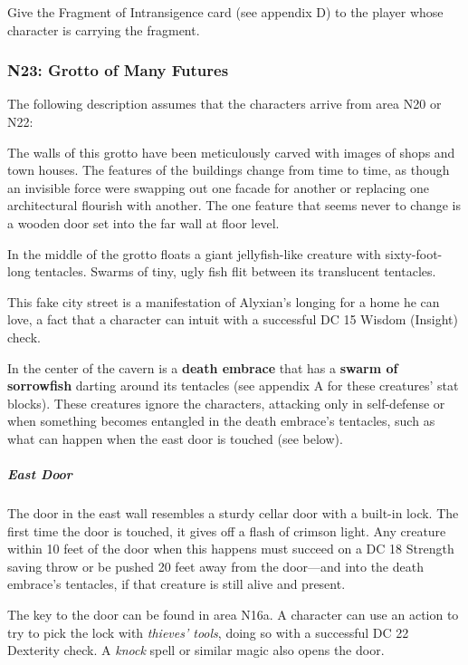 \documentclass[10pt,a4paper,twoside,fancy,bg=print,twocolumn,openany,nodeprecatedcode]{dndbook}
\begin{document}
Give the Fragment of Intransigence card (see appendix D) to the player whose character is carrying the fragment.

\subsubsection{N23: Grotto of Many Futures}
The following description assumes that the characters arrive from area N20 or N22:

\begin{DndReadAloud}{}
The walls of this grotto have been meticulously carved with images of shops and town houses. The features of the buildings change from time to time, as though an invisible force were swapping out one facade for another or replacing one architectural flourish with another. The one feature that seems never to change is a wooden door set into the far wall at floor level.

In the middle of the grotto floats a giant jellyfish-like creature with sixty-foot-long tentacles. Swarms of tiny, ugly fish flit between its translucent tentacles.

\end{DndReadAloud}

This fake city street is a manifestation of Alyxian's longing for a home he can love, a fact that a character can intuit with a successful DC 15 Wisdom (Insight) check.

In the center of the cavern is a \textbf{death embrace} that has a \textbf{swarm of sorrowfish} darting around its tentacles (see appendix A for these creatures' stat blocks). These creatures ignore the characters, attacking only in self-defense or when something becomes entangled in the death embrace's tentacles, such as what can happen when the east door is touched (see below).

\subparagraph{East Door}
The door in the east wall resembles a sturdy cellar door with a built-in lock. The first time the door is touched, it gives off a flash of crimson light. Any creature within 10 feet of the door when this happens must succeed on a DC 18 Strength saving throw or be pushed 20 feet away from the door—and into the death embrace's tentacles, if that creature is still alive and present.

The key to the door can be found in area N16a. A character can use an action to try to pick the lock with \textit{thieves' tools}, doing so with a successful DC 22 Dexterity check. A \textit{knock} spell or similar magic also opens the door.
\end{document}
